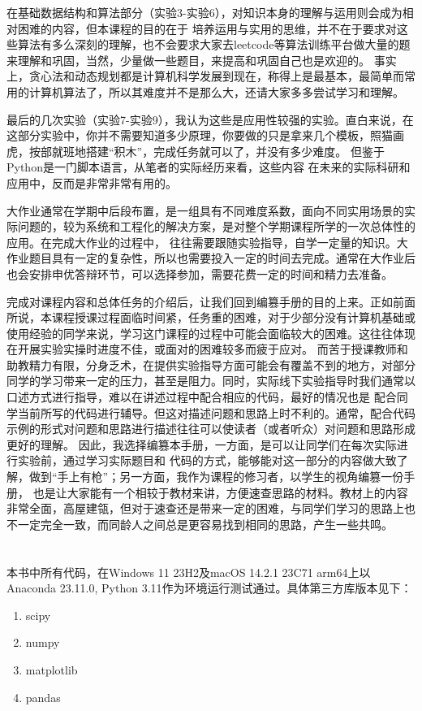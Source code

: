\documentclass[UTF8,a5paper,10pt]{ctexbook}
\makeatletter
\renewcommand\tableofcontents{%
    \thispagestyle{empty}
    \section*{\contentsname
        \@mkboth{%
           \MakeUppercase\contentsname}{\MakeUppercase\contentsname}}%
    \@starttoc{toc}%
    \newpage
    }
\makeatother
\begin{document}
在基础数据结构和算法部分（实验3-实验6），对知识本身的理解与运用则会成为相对困难的内容，但本课程的目的在于
培养运用与实用的思维，并不在于要求对这些算法有多么深刻的理解，也不会要求大家去leetcode等算法训练平台做大量的题来理解和巩固，当然，少量做一些题目，来提高和巩固自己也是欢迎的。
事实上，贪心法和动态规划都是计算机科学发展到现在，称得上是最基本，最简单而常用的计算机算法了，所以其难度并不是那么大，还请大家多多尝试学习和理解。

最后的几次实验（实验7-实验9），我认为这些是应用性较强的实验。直白来说，在这部分实验中，你并不需要知道多少原理，你要做的只是拿来几个模板，照猫画虎，按部就班地搭建“积木”，完成任务就可以了，并没有多少难度。
但鉴于Python是一门脚本语言，从笔者的实际经历来看，这些内容
在未来的实际科研和应用中，反而是非常非常有用的。

大作业通常在学期中后段布置，是一组具有不同难度系数，面向不同实用场景的实际问题的，较为系统和工程化的解决方案，是对整个学期课程所学的一次总体性的应用。在完成大作业的过程中，
往往需要跟随实验指导，自学一定量的知识。大作业题目具有一定的复杂性，所以也需要投入一定的时间去完成。通常在大作业后也会安排申优答辩环节，可以选择参加，需要花费一定的时间和精力去准备。

完成对课程内容和总体任务的介绍后，让我们回到编篡手册的目的上来。正如前面所说，本课程授课过程面临时间紧，任务重的困难，对于少部分没有计算机基础或使用经验的同学来说，学习这门课程的过程中可能会面临较大的困难。这往往体现在开展实验实操时进度不佳，或面对的困难较多而疲于应对。
而苦于授课教师和助教精力有限，分身乏术，在提供实验指导方面可能会有覆盖不到的地方，对部分同学的学习带来一定的压力，甚至是阻力。同时，实际线下实验指导时我们通常以口述方式进行指导，难以在讲述过程中配合相应的代码，最好的情况也是
配合同学当前所写的代码进行辅导。但这对描述问题和思路上时不利的。通常，配合代码示例的形式对问题和思路进行描述往往可以使读者（或者听众）对问题和思路形成更好的理解。
因此，我选择编篡本手册，一方面，是可以让同学们在每次实际进行实验前，通过学习实际题目和
代码的方式，能够能对这一部分的内容做大致了解，做到“手上有枪”；另一方面，我作为课程的修习者，以学生的视角编篡一份手册，
也是让大家能有一个相较于教材来讲，方便速查思路的材料。教材上的内容非常全面，高屋建瓴，但对于速查还是带来一定的困难，与同学们学习的思路上也不一定完全一致，而同龄人之间总是更容易找到相同的思路，产生一些共鸣。
\newpage
\tableofcontents
\thispagestyle{empty}
本书中所有代码，在Windows 11 23H2及macOS 14.2.1 23C71 arm64上以Anaconda 23.11.0, Python 3.11作为环境运行测试通过。具体第三方库版本见下：
\begin{enumerate}
    \item scipy
    \item numpy
    \item matplotlib
    \item pandas
\end{enumerate}
\newpage
{}

\end{document}
